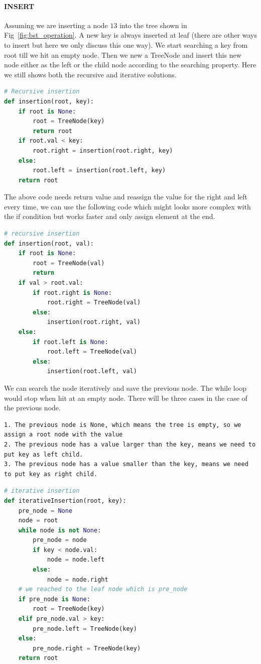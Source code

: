 \documentclass[data-structure.tex]{subfiles}
\begin{document}
\paragraph{INSERT}
Assuming we are inserting a node $13$ into the tree shown in Fig~\ref{fig:bst_operation}. A new key is always inserted at leaf (there are other ways to insert but here we only discuss this one way). We start searching a key from root till we hit an empty node. Then we new a TreeNode and insert this new node either as the left or the child node according to the searching property. Here we still shows both the recursive and iterative solutions.
\begin{lstlisting}[language = Python]
# Recursive insertion
def insertion(root, key):
    if root is None:
        root = TreeNode(key)
        return root
    if root.val < key:
        root.right = insertion(root.right, key)
    else:
        root.left = insertion(root.left, key)
    return root
\end{lstlisting}
The above code needs return value and reassign the value for the right and left every time, we can use the following code which might looks more complex with the if condition but works faster and only assign element at the end. 
\begin{lstlisting}[language=Python]
# recursive insertion
def insertion(root, val):
    if root is None:
        root = TreeNode(val)
        return 
    if val > root.val:
        if root.right is None:
            root.right = TreeNode(val)
        else:
            insertion(root.right, val)
    else:
        if root.left is None:
            root.left = TreeNode(val)
        else:
            insertion(root.left, val)
\end{lstlisting}
We can search the node iteratively and save the previous node. The while loop would stop when hit at an empty node.  There will be three cases in the case of the previous node. 
\begin{lstlisting}[numbers=none]
1. The previous node is None, which means the tree is empty, so we assign a root node with the value
2. The previous node has a value larger than the key, means we need to put key as left child.  
3. The previous node has a value smaller than the key, means we need to put key as right child.
\end{lstlisting}
\begin{lstlisting}[language = Python]
# iterative insertion
def iterativeInsertion(root, key):
    pre_node = None
    node = root
    while node is not None:
        pre_node = node
        if key < node.val:
            node = node.left
        else:
            node = node.right
    # we reached to the leaf node which is pre_node
    if pre_node is None:
        root = TreeNode(key)
    elif pre_node.val > key:
        pre_node.left = TreeNode(key)
    else:
        pre_node.right = TreeNode(key)
    return root
\end{lstlisting}
\end{document}
